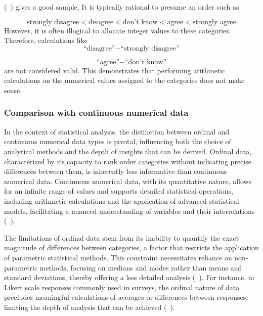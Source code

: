 \documentclass{article}
\begin{document}
(~\textcite{Johnson1999}) gives a good sample,
 It is typically rational to presume an order such as

 \[
 \text{strongly disagree} < \text{disagree} < \text{don’t know} < \text{agree} < \text{strongly agree}
\]
 However, it is often illogical to allocate integer values to these categories. Therefore, calculations like
\[
\text{``disagree''} - \text{``strongly disagree''}
\]

\[
\text{``agree''} - \text{``don't know''}
\]
are not considered valid. 
This demonstrates that performing arithmetic calculations on the numerical values assigned to the categories does not make sense.

\subsubsection*{Comparison with continuous numerical data}

In the context of statistical analysis, the distinction between ordinal and continuous numerical data types is pivotal, influencing both the choice of analytical methods and the depth of insights that can be derived. 
Ordinal data, characterized by its capacity to rank order categories without indicating precise differences between them, is inherently less informative than continuous numerical data. 
Continuous numerical data, with its quantitative nature, allows for an infinite range of values and supports detailed statistical operations, including arithmetic calculations and the application of advanced statistical models, facilitating a nuanced understanding of variables and their interrelations (~\cite{Stevens1946}).

The limitations of ordinal data stem from its inability to quantify the exact magnitude of differences between categories, a factor that restricts the application of parametric statistical methods. This constraint necessitates reliance on non-parametric methods, focusing on medians and modes rather than means and standard deviations, thereby offering a less detailed analysis (~\cite{Conover1999}). 
For instance, in Likert scale responses commonly used in surveys, the ordinal nature of data precludes meaningful calculations of averages or differences between responses, limiting the depth of analysis that can be achieved (~\cite{Likert1932}).
\end{document}
